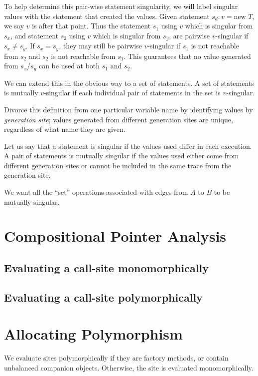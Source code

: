 \documentclass[11pt,notitlepage]{article}
\begin{document}
To help determine this pair-wise statement singularity, we will label
singular values with the statement that created the values.  Given
statement $s_d : v = \text{new }T$, we say $v$ is  after that point.  Thus the statement $s_1$ using $v$
which is singular from $s_x$, and statement $s_2$ using $v$ which is
singular from $s_y$, are pairwise $v$-singular if $s_x \neq s_y$.
If $s_x = s_y$, they may still be pairwise $v$-singular if $s_1$ is
not reachable from $s_2$ and $s_2$ is not reachable from $s_1$.  This
guarantees that no value generated from $s_x$/$s_y$ can be used at
both $s_1$ and $s_2$.

We can extend this in the obvious way to a set of statements.  A
set of statements is mutually $v$-singular if each individual pair of
statements in the set is $v$-singular.

Divorce this definition from one particular variable name by
identifying values by \textit{generation site}; values generated from
different generation sites are unique, regardless of what name they
are given.

Let us say that a statement is singular if the values used differ in
each execution.  A pair of statements is mutually singular if the
values used either come from different generation sites or cannot be
included in the same trace from the generation site.

We want all the ``set'' operations associated with edges from $A$ to $B$
to be mutually singular.

\section{Compositional Pointer Analysis}

\subsection{Evaluating a call-site monomorphically}
\subsection{Evaluating a call-site polymorphically}

\section{Allocating Polymorphism}

We evaluate sites polymorphically if they are factory methods, or
contain unbalanced companion objects.  Otherwise, the site is
evaluated monomorphically.
\end{document}
